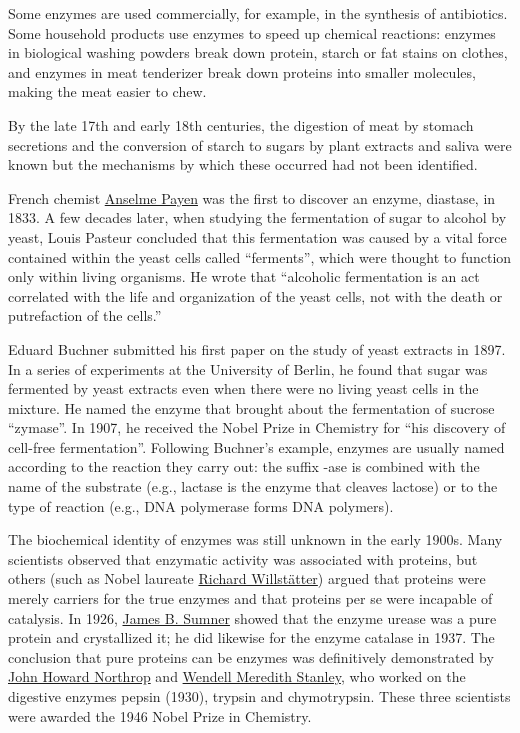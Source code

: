 Some enzymes are used commercially, for example, in the synthesis of antibiotics. Some household products use enzymes to speed up chemical reactions: enzymes in biological washing powders break down protein, starch or fat stains on clothes, and enzymes in meat tenderizer break down proteins into smaller molecules, making the meat easier to chew.

By the late 17th and early 18th centuries, the digestion of meat by stomach secretions and the conversion of starch to sugars by plant extracts and saliva were known but the mechanisms by which these occurred had not been identified.

French chemist \href{https://en.wikipedia.org/wiki/Anselme_Payen}{Anselme Payen} was the first to discover an enzyme, diastase, in 1833. A few decades later, when studying the fermentation of sugar to alcohol by yeast, Louis Pasteur concluded that this fermentation was caused by a vital force contained within the yeast cells called ``ferments'', which were thought to function only within living organisms. He wrote that ``alcoholic fermentation is an act correlated with the life and organization of the yeast cells, not with the death or putrefaction of the cells.''

Eduard Buchner submitted his first paper on the study of yeast extracts in 1897. In a series of experiments at the University of Berlin, he found that sugar was fermented by yeast extracts even when there were no living yeast cells in the mixture. He named the enzyme that brought about the fermentation of sucrose ``zymase''. In 1907, he received the Nobel Prize in Chemistry for ``his discovery of cell-free fermentation''. Following Buchner's example, enzymes are usually named according to the reaction they carry out: the suffix -ase is combined with the name of the substrate (e.g., lactase is the enzyme that cleaves lactose) or to the type of reaction (e.g., DNA polymerase forms DNA polymers).

The biochemical identity of enzymes was still unknown in the early 1900s. Many scientists observed that enzymatic activity was associated with proteins, but others (such as Nobel laureate \href{https://en.wikipedia.org/wiki/Richard_Willstätter}{Richard Willstätter}) argued that proteins were merely carriers for the true enzymes and that proteins per se were incapable of catalysis. In 1926, \href{https://en.wikipedia.org/wiki/James_B._Sumner}{James B. Sumner} showed that the enzyme urease was a pure protein and crystallized it; he did likewise for the enzyme catalase in 1937. The conclusion that pure proteins can be enzymes was definitively demonstrated by \href{https://en.wikipedia.org/wiki/John_Howard_Northrop}{John Howard Northrop} and \href{https://en.wikipedia.org/wiki/Wendell_Meredith_Stanley}{Wendell Meredith Stanley}, who worked on the digestive enzymes pepsin (1930), trypsin and chymotrypsin. These three scientists were awarded the 1946 Nobel Prize in Chemistry.

